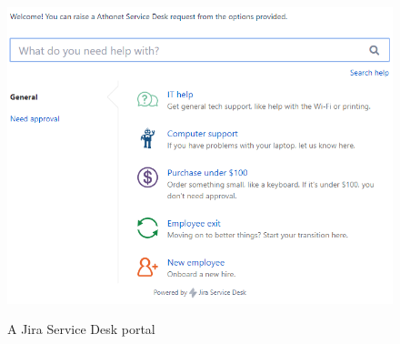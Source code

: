 	\begin{figure}[H]
		\centering
		\includegraphics[width=\textwidth]{resources/Annotation2019-07-24170249}\\
		\caption{A Jira Service Desk portal}
	\end{figure}





